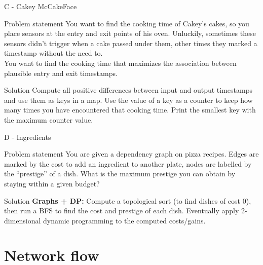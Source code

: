 \documentclass{beamer}
\begin{document}
    \begin{frame}{C - Cakey McCakeFace}
        \begin{block}{Problem statement}
            You want to find the cooking time of Cakey's cakes, so you place sensors at the entry
            and exit points of his oven. Unluckily, sometimes these sensors didn't trigger when a cake
            passed under them, other times they marked a timestamp without the need to.\\
            You want to find the cooking time that maximizes the association between plausible 
            entry and exit timestamps.
        \end{block}
        \pause
        \begin{block}{Solution}
            Compute all positive differences between input and output timestamps and use them as keys
            in a map. Use the value of a key as a counter to keep how many times you have encountered
            that cooking time. Print the smallest key with the maximum counter value.
        \end{block}
    \end{frame}

    \begin{frame}{D - Ingredients}
        \begin{block}{Problem statement}
            You are given a dependency graph on pizza recipes. Edges are marked by the cost to add an
            ingredient to another plate, nodes are labelled by the ``prestige'' of a dish.
            What is the maximum prestige you can obtain by staying within a given budget?
        \end{block}
        \pause
        \begin{block}{Solution}
            \textbf{Graphs + DP:}
            Compute a topological sort (to find dishes of cost 0), then 
            run a BFS to find the cost and prestige of each dish. Eventually apply 2-dimensional 
            dynamic programming to the computed costs/gains.
        \end{block}
    \end{frame}


    \section{Network flow}
\end{document}
